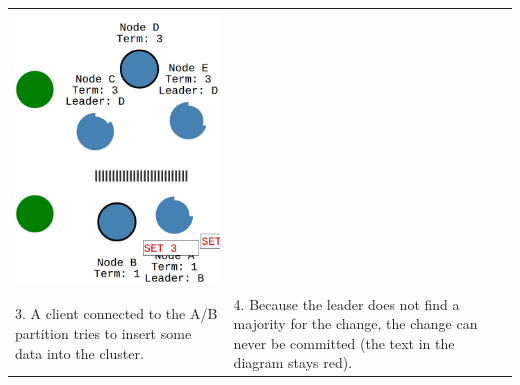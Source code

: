 \begin{tabularx}{\textwidth}{ |X|X| }
  \includegraphics[scale=0.28]{scenarios/network_partition/1656.png} \\
  3. A client connected to the A/B partition tries to insert some data into the cluster.  &
  4. Because the leader does not find a majority for the change, the change can never be committed (the text in the diagram stays red).  \\
  \hline
\end{tabularx}

